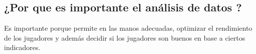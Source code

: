 \subsection{¿Por que es importante el análisis de datos ?} 

Es importante porque permite en las manos adecuadas, optimizar el
rendimiento de los jugadores y además decidir si los jugadores son buenos en base a ciertos 
indicadores.






